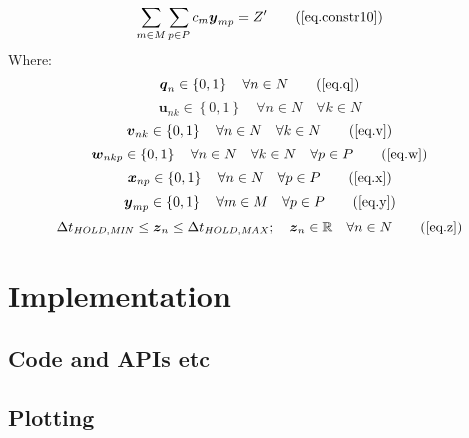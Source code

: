 \begin{equation}
    \sum_{m \in M} \sum_{p \in P} c_m \boldsymbol{y}_{mp} = Z^{\prime}
    \tag{\ref{eq.constr10}}
\end{equation}
Where:
\begin{equation}
    \boldsymbol{q}_{n} \in \left\{ 0, 1 \right\} \quad \forall n \in N
    \tag{\ref{eq.q}}
\end{equation}
\begin{equation}
    \boldsymbol{u}_{nk} \in \left\{ 0, 1 \right\} \quad \forall n \in N \quad
    \forall k \in N
    \label{eq.u}
\end{equation}
\begin{equation}
    \boldsymbol{v}_{nk} \in \left\{ 0, 1 \right\} \quad \forall n \in N \quad
    \forall k \in N
    \tag{\ref{eq.v}}
\end{equation}
\begin{equation}
    \boldsymbol{w}_{nkp} \in \left\{ 0, 1 \right\} \quad \forall n \in N \quad
    \forall k \in N \quad \forall p \in P
    \tag{\ref{eq.w}}
\end{equation}
\begin{equation}
    \boldsymbol{x}_{np} \in \left\{ 0, 1 \right\} \quad \forall n \in N \quad
    \forall p \in P
    \tag{\ref{eq.x}}
\end{equation}
\begin{equation}
    \boldsymbol{y}_{mp} \in \left\{ 0, 1 \right\} \quad \forall m \in M \quad
    \forall p \in P
    \tag{\ref{eq.y}}
\end{equation}
\begin{equation}
    \Delta t_{\mathit{HOLD,MIN}} \le \boldsymbol{z}_{n} \le \Delta
    t_{\mathit{HOLD,MAX}}; \quad \boldsymbol{z}_{n} \in \mathbb{R} \quad
    \forall n \in N
    \tag{\ref{eq.z}}
\end{equation}


\section{Implementation}\label{S.implementation}

\subsection{Code and APIs etc}\label{SS.completesummary}

\subsection{Plotting}\label{SS.completesummary}
